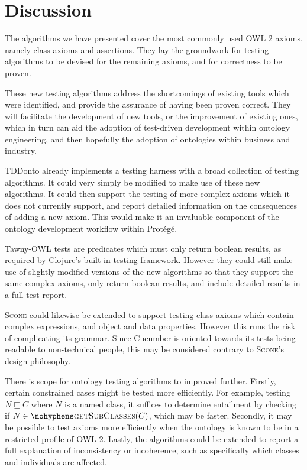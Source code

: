 \documentclass[paper.tex]{subfiles}
\begin{document}
\section{Discussion}
\label{sec:discussion}

The algorithms we have presented cover the most commonly used OWL 2 axioms, namely class axioms and assertions. 
They lay the groundwork for testing algorithms to be devised for the remaining axioms, and for correctness to be proven.

These new testing algorithms address the shortcomings of existing tools which were identified, and provide the assurance of having been proven correct.
They will facilitate the development of new tools, or the improvement of existing ones, which in turn can aid the adoption of test-driven development within ontology engineering, and then hopefully the adoption of ontologies within business and industry.

TDDonto already implements a testing harness with a broad collection of testing algorithms.
It could very simply be modified to make use of these new algorithms.
It could then support the testing of more complex axioms which it does not currently support, and report detailed information on the consequences of adding a new axiom.
This would make it an invaluable component of the ontology development workflow within Prot\'eg\'e.

Tawny-OWL tests are predicates which must only return boolean results, as required by Clojure's built-in testing framework.
However they could still make use of slightly modified versions of the new algorithms so that they support the same complex axioms, only return boolean results, and include detailed results in a full test report.

\textsc{Scone} could likewise be extended to support testing class axioms which contain complex expressions, and object and data properties.
However this runs the risk of complicating its grammar.
Since Cucumber is oriented towards its tests being readable to non-technical people, this may be considered contrary to \textsc{Scone}'s design philosophy.

There is scope for ontology testing algorithms to improved further.
Firstly, certain constrained cases might be tested more efficiently.
For example, testing $N \sqsubseteq C$ where $N$ is a named class, it suffices to determine entailment by checking if $N \in \textproc{getSubClasses}(C)$, which may be faster.
Secondly, it may be possible to test axioms more efficiently when the ontology is known to be in a restricted profile of OWL 2.
Lastly, the algorithms could be extended to report a full explanation of inconsistency or incoherence, such as specifically which classes and individuals are affected.
\end{document}
